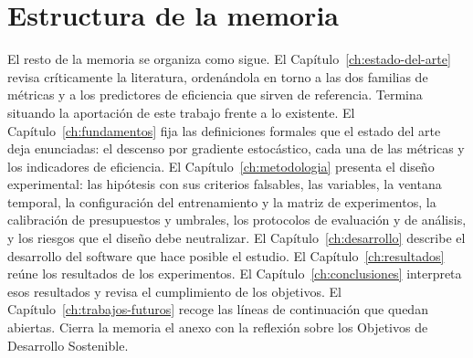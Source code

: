 \section{Estructura de la memoria}
\label{sec:estructura}

El resto de la memoria se organiza como sigue. El Capítulo~\ref{ch:estado-del-arte} revisa críticamente la literatura, ordenándola en torno a las dos familias de métricas y a los predictores de eficiencia que sirven de referencia. Termina situando la aportación de este trabajo frente a lo existente. El Capítulo~\ref{ch:fundamentos} fija las definiciones formales que el estado del arte deja enunciadas: el descenso por gradiente estocástico, cada una de las métricas y los indicadores de eficiencia. El Capítulo~\ref{ch:metodologia} presenta el diseño experimental: las hipótesis con sus criterios falsables, las variables, la ventana temporal, la configuración del entrenamiento y la matriz de experimentos, la calibración de presupuestos y umbrales, los protocolos de evaluación y de análisis, y los riesgos que el diseño debe neutralizar. El Capítulo~\ref{ch:desarrollo} describe el desarrollo del software que hace posible el estudio. El Capítulo~\ref{ch:resultados} reúne los resultados de los experimentos. El Capítulo~\ref{ch:conclusiones} interpreta esos resultados y revisa el cumplimiento de los objetivos. El Capítulo~\ref{ch:trabajos-futuros} recoge las líneas de continuación que quedan abiertas. Cierra la memoria el anexo con la reflexión sobre los Objetivos de Desarrollo Sostenible.
